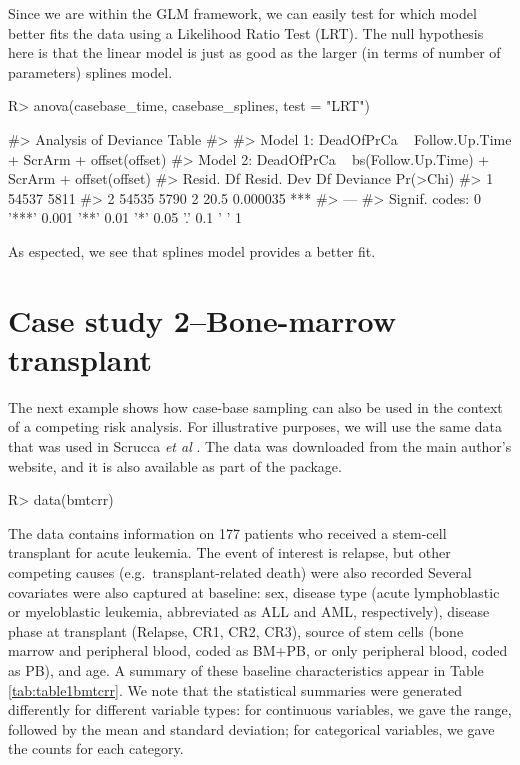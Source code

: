 \documentclass[
]{jss}
\begin{document}
Since we are within the GLM framework, we can easily test for which
model better fits the data using a Likelihood Ratio Test (LRT). The null
hypothesis here is that the linear model is just as good as the larger
(in terms of number of parameters) splines model.

\begin{CodeChunk}

\begin{CodeInput}
R> anova(casebase_time, casebase_splines, test = "LRT")
\end{CodeInput}

\begin{CodeOutput}
#> Analysis of Deviance Table
#> 
#> Model 1: DeadOfPrCa ~ Follow.Up.Time + ScrArm + offset(offset)
#> Model 2: DeadOfPrCa ~ bs(Follow.Up.Time) + ScrArm + offset(offset)
#>   Resid. Df Resid. Dev Df Deviance Pr(>Chi)    
#> 1     54537       5811                         
#> 2     54535       5790  2     20.5 0.000035 ***
#> ---
#> Signif. codes:  0 '***' 0.001 '**' 0.01 '*' 0.05 '.' 0.1 ' ' 1
\end{CodeOutput}
\end{CodeChunk}

As espected, we see that splines model provides a better fit.

\hypertarget{case-study-2bone-marrow-transplant}{%
\section{Case study 2--Bone-marrow
transplant}\label{case-study-2bone-marrow-transplant}}

The next example shows how case-base sampling can also be used in the
context of a competing risk analysis. For illustrative purposes, we will
use the same data that was used in Scrucca \emph{et al}
\citeyearpar{scrucca2010regression}. The data was downloaded from the
main author's website, and it is also available as part of the
 package.

\begin{CodeChunk}

\begin{CodeInput}
R> data(bmtcrr)
\end{CodeInput}
\end{CodeChunk}

The data contains information on 177 patients who received a stem-cell
transplant for acute leukemia. The event of interest is relapse, but
other competing causes (e.g.~transplant-related death) were also
recorded Several covariates were also captured at baseline: sex, disease
type (acute lymphoblastic or myeloblastic leukemia, abbreviated as ALL
and AML, respectively), disease phase at transplant (Relapse, CR1, CR2,
CR3), source of stem cells (bone marrow and peripheral blood, coded as
BM+PB, or only peripheral blood, coded as PB), and age. A summary of
these baseline characteristics appear in Table \ref{tab:table1bmtcrr}.
We note that the statistical summaries were generated differently for
different variable types: for continuous variables, we gave the range,
followed by the mean and standard deviation; for categorical variables,
we gave the counts for each category.
\end{document}
